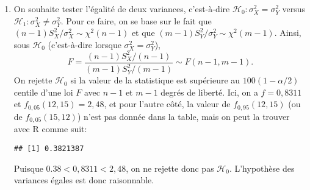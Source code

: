 \begin{solution}{6.7}
\begin{enumerate}
 \item On souhaite tester l'égalité de deux variances, c'est-à-dire $ \mathcal{H}_0: \sigma_X^2 = \sigma_Y^2$ versus $ \mathcal{H}_1: \sigma_X^2 \ne \sigma_Y^2$. Pour ce faire, on se base sur le fait que
 $(n-1) S_X^2/\sigma_X^2 \sim \chi^2(n - 1)$ et que $(m-1) S_Y^2/\sigma_Y^2 \sim \chi^2(m - 1)$. Ainsi, sous $ \mathcal{H}_0$ (c'est-à-dire lorsque  $\sigma_X^2 = \sigma_Y^2$),
      \begin{displaymath}
        F = \frac{(n-1) S_X^2/(n - 1)}{(m-1) S_Y^2/(m - 1)} \sim F(n - 1, m - 1).
      \end{displaymath}
      On rejette $ \mathcal{H}_0$ si la valeur de la statistique est supérieure
      au $100(1 - \alpha/2)${\ieme} centile d'une loi $F$ avec $n - 1$
      et $m - 1$ degrés de liberté. Ici, on a $f = 0,8311$ et
      $f_{0,05}(12, 15) = 2,48$, et pour l'autre côté, la valeur de $f_{0,95}(12, 15)$ (ou de $f_{0,05}(15, 12)$) n'est pas donnée dans la table, mais on peut la trouver avec \textsf{R} comme suit:
\begin{knitrout}
\color{fgcolor}\begin{kframe}
\begin{alltt}
\hlstd{(}\hlstd{,}\hlstd{,}\hlstd{)}
\end{alltt}
\begin{verbatim}
## [1] 0.3821387
\end{verbatim}
\end{kframe}
\end{knitrout}
     Puisque $0.38 < 0,8311 < 2,48$,  on ne rejette donc pas $ \mathcal{H}_0$.
    L'hypothèse des variances égales est donc raisonnable.
    \end{enumerate}
  
\end{solution}
